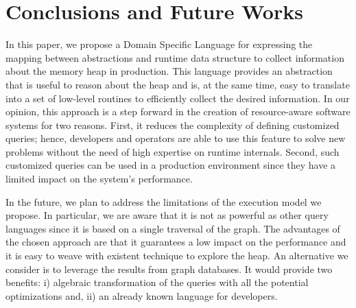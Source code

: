 









\section{Conclusions and Future Works}\label{sec:conclusions}

In this paper, we propose a Domain Specific Language for expressing the mapping between abstractions and runtime data structure to collect information about the memory heap in production. This language provides an abstraction that is useful to reason about the heap and is, at the same time, easy to translate into a set of low-level routines to efficiently collect the desired information.
In our opinion, this approach is a step forward in the creation of resource-aware software systems for two reasons. 
First, it reduces the complexity of defining customized queries; hence, developers and operators are able to use this feature to solve new problems without the need of high expertise on runtime internals.
Second, such customized queries can be used in a production environment since they have a limited impact on the system's performance.

In the future, we plan to address the limitations of the execution model we propose.
In particular, we are aware that it is not as powerful as other query languages since it is based on a single traversal of the graph.
The advantages of the chosen approach are that it guarantees a low impact on the performance and it is easy to weave with existent technique to explore the heap.
An alternative we consider is to leverage the results from graph databases.
It would provide two benefits: i) algebraic transformation of the queries with all the potential optimizations and, ii) an already known language for developers.


